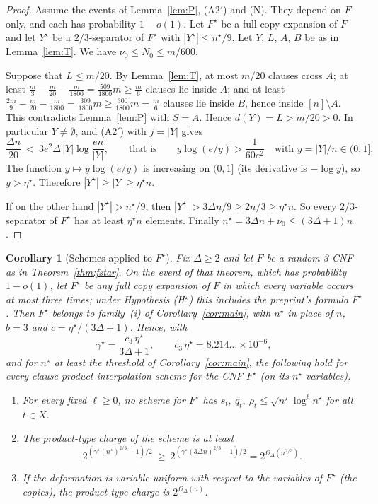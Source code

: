 \documentclass[11pt,a4paper]{article}
\newtheorem{corollary}[theorem]{Corollary}
\theoremstyle{definition}
\theoremstyle{remark}
\begin{document}
\begin{proof}
Assume the events of Lemma~\ref{lem:P}, (A2$'$) and (N). They depend on $F$ only, and each
has probability $1-o(1)$. Let $F^\star$ be a full copy expansion of $F$ and let $Y^\star$ be
a $2/3$-separator of $F^\star$ with $|Y^\star|\le n^\star/9$. Let $Y$, $L$, $A$, $B$ be as in
Lemma~\ref{lem:T}. We have $\nu_0\le N_0\le m/600$.

Suppose that $L\le m/20$. By Lemma~\ref{lem:T}, at most $m/20$ clauses cross $A$; at least
$\frac m3-\frac m{20}-\frac m{1800}=\frac{509}{1800}m\ge\frac m6$ clauses lie inside $A$; and
at least $\frac{2m}9-\frac m{20}-\frac m{1800}=\frac{309}{1800}m\ge\frac{300}{1800}m=\frac m6$
clauses lie inside $B$, hence inside $[n]\setminus A$. This contradicts Lemma~\ref{lem:P}
with $S=A$. Hence $d(Y)=L>m/20>0$. In particular $Y\ne\emptyset$, and (A2$'$) with $j=|Y|$
gives
\[
\frac{\Delta n}{20}\ <\ 3e^2\Delta\,|Y|\log\frac{en}{|Y|},\qquad\text{that is}\qquad
y\log(e/y)>\frac1{60e^2}\quad\text{with }y=|Y|/n\in(0,1].
\]
The function $y\mapsto y\log(e/y)$ is increasing on $(0,1]$ (its derivative is $-\log y$),
so $y>\eta^\star$. Therefore $|Y^\star|\ge|Y|\ge\eta^\star n$.

If on the other hand $|Y^\star|>n^\star/9$, then
$|Y^\star|>3\Delta n/9\ge2n/3\ge\eta^\star n$. So every $2/3$-separator of $F^\star$ has at
least $\eta^\star n$ elements. Finally $n^\star=3\Delta n+\nu_0\le(3\Delta+1)n$.
\end{proof}

\begin{corollary}[Schemes applied to $F^\star$]\label{cor:fstar}
Fix $\Delta\ge2$ and let $F$ be a random 3-CNF as in Theorem~\ref{thm:fstar}. On the event
of that theorem, which has probability $1-o(1)$, let $F^\star$ be any full copy expansion of
$F$ in which every variable occurs at most three times; under Hypothesis
\textup{(H$^\star$)} this includes the preprint's formula $F^\star$. Then $F^\star$ belongs
to family~\textup{(i)} of Corollary~\ref{cor:main}, with $n^\star$ in place of $n$, $b=3$
and $c=\eta^\star/(3\Delta+1)$. Hence, with
\[
\gamma^\star=\frac{c_3\,\eta^\star}{3\Delta+1},\qquad c_3\,\eta^\star=8.214\ldots\times10^{-6},
\]
and for $n^\star$ at least the threshold of Corollary~\ref{cor:main}, the following hold for
every clause-product interpolation scheme for the CNF $F^\star$ (on its $n^\star$
variables).
\begin{enumerate}
\item For every fixed $\ell\ge0$, no scheme for $F^\star$ has
 $s_t,\ q_t,\ \rho_t\le\sqrt{n^\star}\log^\ell n^\star$ for all $t\in X$.
\item The product-type charge of the scheme is at least
 \[
 2^{(\gamma^\star (n^\star)^{2/3}-1)/2}\ \ge\ 2^{(\gamma^\star(3\Delta n)^{2/3}-1)/2}
 =2^{\Omega_\Delta(n^{2/3})} .
 \]
\item If the deformation is variable-uniform with respect to the variables of $F^\star$
 (the copies), the product-type charge is $2^{\Omega_\Delta(n)}$.
\end{enumerate}
\end{corollary}
\end{document}
